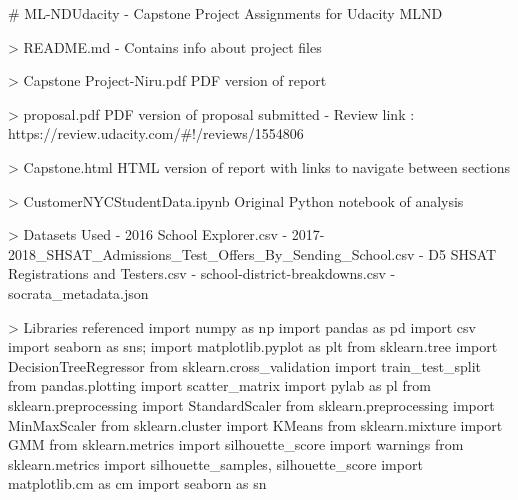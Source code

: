 # ML-NDUdacity
- Capstone Project Assignments for Udacity MLND

> README.md 
- Contains info about project files

> Capstone Project-Niru.pdf
PDF  version of report 

> proposal.pdf
PDF  version of proposal submitted
- Review link : https://review.udacity.com/#!/reviews/1554806

> Capstone.html
HTML version of report with links to navigate between sections

> CustomerNYCStudentData.ipynb
Original Python notebook of analysis

> Datasets Used
- 2016 School Explorer.csv
- 2017-2018_SHSAT_Admissions_Test_Offers_By_Sending_School.csv	
- D5 SHSAT Registrations and Testers.csv
- school-district-breakdowns.csv
- socrata_metadata.json

> Libraries referenced
import numpy as np
import pandas as pd
import csv
import seaborn as sns; 
import matplotlib.pyplot as plt
from sklearn.tree import DecisionTreeRegressor
from sklearn.cross_validation import train_test_split
from pandas.plotting import scatter_matrix
import pylab as pl
from sklearn.preprocessing import StandardScaler
from sklearn.preprocessing import MinMaxScaler
from sklearn.cluster import KMeans
from sklearn.mixture import GMM
from sklearn.metrics import silhouette_score
import warnings
from sklearn.metrics import silhouette_samples, silhouette_score
import matplotlib.cm as cm
import seaborn as sn

